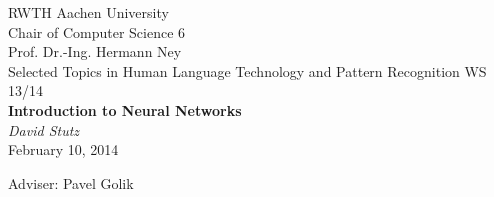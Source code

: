 \documentclass[twoside,11pt,a4paper]{article}
\begin{document}
\nocite{*} %

\pagestyle{empty}

\begin{center}

    RWTH Aachen University\\
    Chair of Computer Science 6\\
    Prof. Dr.-Ing. Hermann Ney\\[6ex]
    Selected Topics in Human Language Technology and Pattern Recognition WS 13/14\\[12ex]
   
    \LARGE
    \textbf{Introduction to Neural Networks} \\[6ex]
    \textit{David Stutz} \\[6ex]
    \Large
    February 10, 2014

    \vfill
    \Large Adviser: Pavel Golik
	    
\end{center}

\newpage
\newpage

\pagestyle{headings}
\tableofcontents
\listoftables
\listoffigures
\newpage
\pagestyle{empty}

\newpage
\pagestyle{headings}



\newpage



\newpage



\newpage



\newpage



\newpage



\newpage





\end{document}
